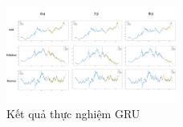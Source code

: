 \begin{figure}[htbp]
\centerline{\includegraphics[width=0.5\textwidth]{img/GRU_result.png}}
\caption{Kết quả thực nghiệm GRU}
\label{fig}
\end{figure}